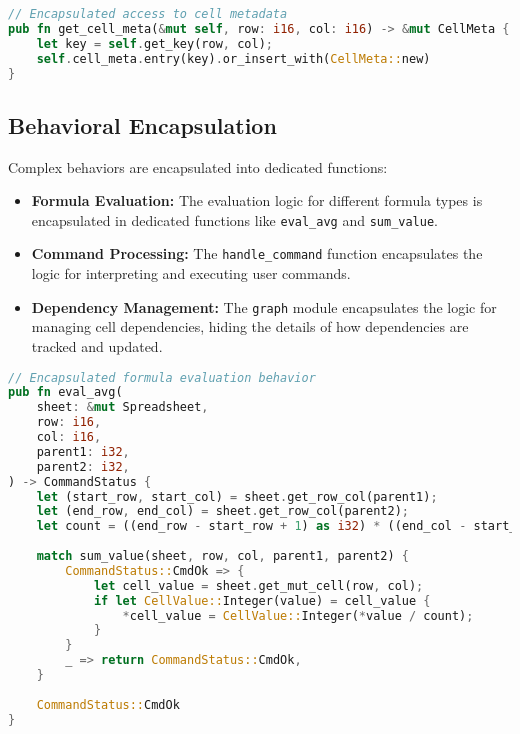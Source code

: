 \documentclass[11pt,a4paper]{article}
\begin{document}
\begin{lstlisting}[language=Rust, caption={Data encapsulation with accessor methods}, label=lst:data-encap]
// Encapsulated access to cell metadata
pub fn get_cell_meta(&mut self, row: i16, col: i16) -> &mut CellMeta {
    let key = self.get_key(row, col);
    self.cell_meta.entry(key).or_insert_with(CellMeta::new)
}
\end{lstlisting}

\subsection{Behavioral Encapsulation}

Complex behaviors are encapsulated into dedicated functions:

\begin{itemize}
  \item \textbf{Formula Evaluation:} The evaluation logic for different formula types is encapsulated in dedicated functions like \lstinline{eval_avg} and \lstinline{sum_value}.
  
  \item \textbf{Command Processing:} The \lstinline{handle_command} function encapsulates the logic for interpreting and executing user commands.
  
  \item \textbf{Dependency Management:} The \lstinline{graph} module encapsulates the logic for managing cell dependencies, hiding the details of how dependencies are tracked and updated.
\end{itemize}

\begin{lstlisting}[language=Rust, caption={Behavioral encapsulation in formula evaluation}, label=lst:behavior-encap]
// Encapsulated formula evaluation behavior
pub fn eval_avg(
    sheet: &mut Spreadsheet,
    row: i16,
    col: i16,
    parent1: i32,
    parent2: i32,
) -> CommandStatus {
    let (start_row, start_col) = sheet.get_row_col(parent1);
    let (end_row, end_col) = sheet.get_row_col(parent2);
    let count = ((end_row - start_row + 1) as i32) * ((end_col - start_col + 1) as i32);
    
    match sum_value(sheet, row, col, parent1, parent2) {
        CommandStatus::CmdOk => {
            let cell_value = sheet.get_mut_cell(row, col);
            if let CellValue::Integer(value) = cell_value {
                *cell_value = CellValue::Integer(*value / count);
            }
        }
        _ => return CommandStatus::CmdOk,
    }
    
    CommandStatus::CmdOk
}
\end{lstlisting}
\end{document}
